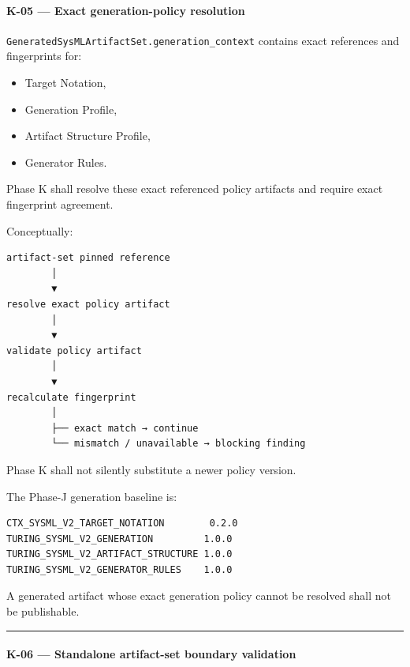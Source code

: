 \hypertarget{k-05--exact-generation-policy-resolution}{%
\paragraph{K-05 --- Exact generation-policy resolution}\label{k-05--exact-generation-policy-resolution}}

\texttt{GeneratedSysMLArtifactSet.generation\_context} contains exact references and fingerprints for:

\begin{itemize}
\tightlist
\item
  Target Notation,
\item
  Generation Profile,
\item
  Artifact Structure Profile,
\item
  Generator Rules.
\end{itemize}

Phase K shall resolve these exact referenced policy artifacts and require exact fingerprint agreement.

Conceptually:

\begin{verbatim}
artifact-set pinned reference
        │
        ▼
resolve exact policy artifact
        │
        ▼
validate policy artifact
        │
        ▼
recalculate fingerprint
        │
        ├── exact match → continue
        └── mismatch / unavailable → blocking finding
\end{verbatim}

Phase K shall not silently substitute a newer policy version.

The Phase-J generation baseline is:

\begin{verbatim}
CTX_SYSML_V2_TARGET_NOTATION        0.2.0
TURING_SYSML_V2_GENERATION         1.0.0
TURING_SYSML_V2_ARTIFACT_STRUCTURE 1.0.0
TURING_SYSML_V2_GENERATOR_RULES    1.0.0
\end{verbatim}

A generated artifact whose exact generation policy cannot be resolved shall not be publishable.

\begin{center}\rule{0.5\linewidth}{0.5pt}\end{center}

\hypertarget{k-06--standalone-artifact-set-boundary-validation}{%
\paragraph{K-06 --- Standalone artifact-set boundary validation}\label{k-06--standalone-artifact-set-boundary-validation}}

